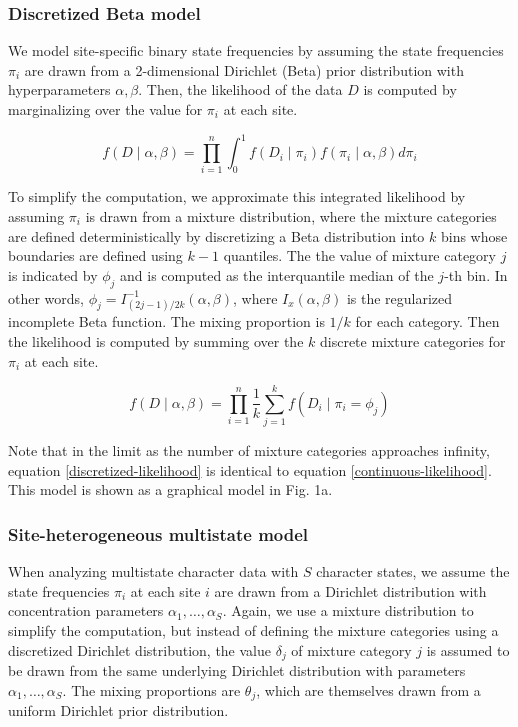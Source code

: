 \documentclass[]{sysbio}
\begin{document}
\subsubsection{Discretized Beta model}
We model site-specific binary state frequencies by assuming the state frequencies $\pi_i$ are drawn from a 2-dimensional Dirichlet (Beta) prior distribution with hyperparameters $\alpha,\beta$.
Then, the likelihood of the data $D$ is computed by marginalizing over the value for $\pi_i$ at each site.

\begin{equation} \label{continuous-likelihood}
f(D\mid \alpha,\beta) = \prod_{i=1}^n\int_0^1 f(D_i \mid \pi_i)f(\pi_i \mid \alpha,\beta)d\pi_i
\end{equation}

To simplify the computation, we approximate this integrated likelihood by assuming $\pi_i$ is drawn from a mixture distribution, where the mixture categories are defined deterministically by discretizing a Beta distribution into $k$ bins whose boundaries are defined using $k-1$ quantiles.
The the value of mixture category $j$ is indicated by $\phi_j$ and is computed as the interquantile median of the $j$-th bin.
In other words, $\phi_j = I^{-1}_{(2j-1)/2k}(\alpha,\beta)$, where $I_x(\alpha,\beta)$ is the regularized incomplete Beta function.
The mixing proportion is $1/k$ for each category.
Then the likelihood is computed by summing over the $k$ discrete mixture categories for $\pi_i$ at each site.

\begin{equation} \label{discretized-likelihood}
f(D\mid \alpha,\beta) = \prod_{i=1}^n\frac{1}{k}\sum_{j=1}^k f(D_i \mid \pi_i = \phi_j)
\end{equation}

Note that in the limit as the number of mixture categories approaches infinity, equation \ref{discretized-likelihood} is identical to equation \ref{continuous-likelihood}.
This model is shown as a graphical model in Fig. 1a.

\subsubsection{Site-heterogeneous multistate model}

When analyzing multistate character data with $S$ character states, we assume the state frequencies $\pi_i$ at each site $i$ are drawn from a Dirichlet distribution with concentration parameters $\alpha_1,\ldots,\alpha_S$.
Again, we use a mixture distribution to simplify the computation, but instead of defining the mixture categories using a discretized Dirichlet distribution, the value $\delta_j$ of mixture category $j$ is assumed to be drawn from the same underlying Dirichlet distribution with parameters $\alpha_1,\ldots,\alpha_S$.
The mixing proportions are $\theta_j$, which are themselves drawn from a uniform Dirichlet prior distribution.
\end{document}
